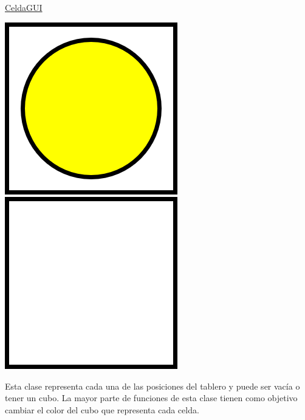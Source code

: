 \documentclass[../DocumentoOficial.tex]{subfiles}
\begin{document}
\begin{sprint}[4]
\underline{CeldaGUI}
\begin{center}
\includegraphics[scale=0.5]{yellowCube.png}
\includegraphics[scale=0.5]{emptyCell.png}
\end{center}

Esta clase representa cada una de las posiciones del tablero y puede ser vacía o tener un cubo. La mayor parte de funciones de esta clase  tienen como objetivo cambiar el color del cubo que representa cada celda.


\end{sprint}
\end{document}
